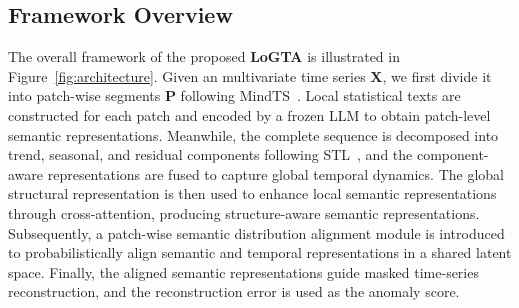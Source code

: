 \documentclass[letterpaper]{article} %
\newcommand{\method}{LoGTA}
\begin{document}
\subsection{Framework Overview}
The overall framework of the proposed \textbf{LoGTA} is illustrated in Figure~\ref{fig:architecture}. Given an  multivariate time series $\mathbf{X}$, we first divide it into patch-wise segments $\mathbf{P}$ following MindTS~\cite{hu2026towards}. Local statistical texts are constructed for each patch and encoded by a frozen LLM to obtain patch-level semantic representations. Meanwhile, the complete sequence is decomposed into trend, seasonal, and residual components following STL~\cite{cleveland1990stl}, 
and the component-aware representations are fused to capture global temporal dynamics. The global structural representation is then used to enhance local semantic representations through cross-attention, producing structure-aware semantic representations. Subsequently, a patch-wise semantic distribution alignment module is introduced to probabilistically align semantic and temporal representations in a shared latent space. Finally, the aligned semantic representations guide masked time-series reconstruction, and the reconstruction error is used as the anomaly score. 
\end{document}
